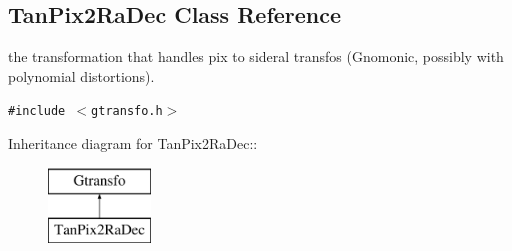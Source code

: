 \subsection{Tan\-Pix2Ra\-Dec  Class Reference}
\label{class_tanpix2radec}
the transformation that handles pix to sideral transfos (Gnomonic, possibly with polynomial distortions). 


{\tt \#include $<$gtransfo.h$>$}

Inheritance diagram for Tan\-Pix2Ra\-Dec::\begin{figure}[H]
\begin{center}
\leavevmode
\includegraphics[height=2cm]{class_tanpix2radec}
\end{center}
\end{figure}
